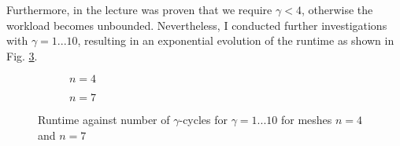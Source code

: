 \documentclass[11pt,a4paper]{article}
\newcommand{\refFig}[1]{Fig. \ref{#1}}
\begin{document}
%
Furthermore, in the lecture was proven that we require $\gamma < 4$, otherwise the workload becomes unbounded. Nevertheless, I conducted further investigations with $\gamma = 1...10$, resulting in an exponential evolution of the runtime as shown in \refFig{fig::TimGamma}.
%
\begin{figure}[h!]
	\centering
	\begin{subfigure}[h!]{.49\textwidth}
		\begin{center}
			\resizebox{0.52\width}{!}{}
			\caption{$n=4$}
			\label{fig::TimGamma1}
		\end{center}	
	\end{subfigure}
	\hfill
	\begin{subfigure}[h!]{.49\textwidth}
		\centering
		\resizebox{0.52\width}{!}{}
		\caption{$n=7$}
		\label{fig::TimGamma2}
	\end{subfigure}
	\caption{Runtime against number of $\gamma$-cycles for $\gamma = 1...10 $ for meshes $n=4$ and $n=7$ }
	\label{fig::TimGamma}
\end{figure}

%
%
\end{document}
